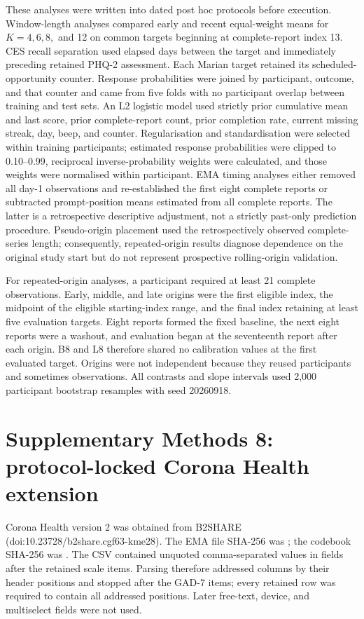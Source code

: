 \documentclass[pdflatex,sn-vancouver-num]{sn-jnl}
\begin{document}
These analyses were written into dated post hoc protocols before execution. Window-length analyses compared early and recent equal-weight means for $K=4,6,8,$ and 12 on common targets beginning at complete-report index 13. CES recall separation used elapsed days between the target and immediately preceding retained PHQ-2 assessment. Each Marian target retained its scheduled-opportunity counter. Response probabilities were joined by participant, outcome, and that counter and came from five folds with no participant overlap between training and test sets. An L2 logistic model used strictly prior cumulative mean and last score, prior complete-report count, prior completion rate, current missing streak, day, beep, and counter. Regularisation and standardisation were selected within training participants; estimated response probabilities were clipped to 0.10--0.99, reciprocal inverse-probability weights were calculated, and those weights were normalised within participant. EMA timing analyses either removed all day-1 observations and re-established the first eight complete reports or subtracted prompt-position means estimated from all complete reports. The latter is a retrospective descriptive adjustment, not a strictly past-only prediction procedure. Pseudo-origin placement used the retrospectively observed complete-series length; consequently, repeated-origin results diagnose dependence on the original study start but do not represent prospective rolling-origin validation.

For repeated-origin analyses, a participant required at least 21 complete observations. Early, middle, and late origins were the first eligible index, the midpoint of the eligible starting-index range, and the final index retaining at least five evaluation targets. Eight reports formed the fixed baseline, the next eight reports were a washout, and evaluation began at the seventeenth report after each origin. B8 and L8 therefore shared no calibration values at the first evaluated target. Origins were not independent because they reused participants and sometimes observations. All contrasts and slope intervals used 2,000 participant bootstrap resamples with seed 20260918.

\section{Supplementary Methods 8: protocol-locked Corona Health extension}

Corona Health version 2 was obtained from B2SHARE (doi:10.23728/b2share.cgf63-kme28). The EMA file SHA-256 was \texttt{}; the codebook SHA-256 was \texttt{}. The CSV contained unquoted comma-separated values in fields after the retained scale items. Parsing therefore addressed columns by their header positions and stopped after the GAD-7 items; every retained row was required to contain all addressed positions. Later free-text, device, and multiselect fields were not used.
\end{document}
